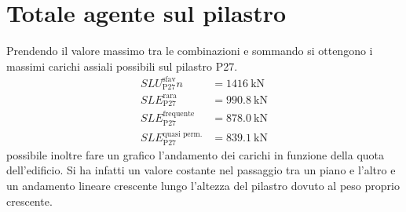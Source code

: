 \section{Totale agente sul pilastro}
Prendendo il valore massimo tra le combinazioni e sommando si ottengono i massimi carichi assiali possibili sul pilastro P27.
\begin{align*} 
	SLU^{\text{sfav}}_{\text{P27}}		n&= \SI{1416}{\kilo\newton} \\	
	SLE^{\text{rara}}_{\text{P27}} 		 &= \SI{990.8}{\kilo\newton} \\
	SLE^{\text{frequente}}_{\text{P27}}  &= \SI{878.0}{\kilo\newton} \\
	SLE^{\text{quasi perm.}}_{\text{P27}}&= \SI{839.1}{\kilo\newton}
\end{align*}
\e possibile inoltre fare un grafico l'andamento dei carichi in funzione della quota dell'edificio.
Si ha infatti un valore costante nel passaggio tra un piano e l'altro e un andamento lineare crescente lungo l'altezza del pilastro dovuto al peso proprio crescente.

